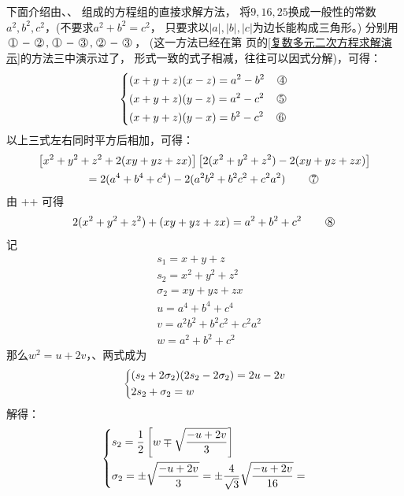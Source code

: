 \begin{enumerate}[label={【\textbf{例\thechapter.\arabic*}】},
 leftmargin=\inteval{\myenumleftmargin}pt,
 itemsep=\inteval{\myenumitempsep}pt,
 itemindent=\inteval{\myenumitemindent}pt]
下面介绍由、、
组成的方程组的直接求解方法，
将$ 9,16,25 $换成一般性的常数$ a^2,b^2,c^2 $，(不要求$ a^2+b^2=c^2 $，
只要求以$ |a|,|b|,|c| $为边长能构成三角形。)
分别用$ \mycircled{1}-\mycircled{2},
\mycircled{1}-\mycircled{3},\mycircled{2}-\mycircled{3} $，
(这一方法已经在第\pageref{复数多元二次方程求解演示} 
页的\ref{复数多元二次方程求解演示}的方法三中演示过了，
形式一致的式子相减，往往可以因式分解)，可得：
\begin{align*}
    \begin{dcases}
        (x+y+z)(x-z)= a^2-b^2 \q \mycircled{4}  \\
        (x+y+z)(y-z)= a^2-c^2 \q \mycircled{5}  \\
        (x+y+z)(y-x)= b^2-c^2 \q \mycircled{6} 
    \end{dcases}
\end{align*}
以上三式左右同时平方后相加，可得：
\begin{gather*}
    \left[ x^2+y^2+z^2+2(xy+yz+zx) \right] \left[ 2(x^2+y^2+z^2)-2(xy+yz+zx) \right] \\
    =2(a^4+b^4+c^4)-2(a^2b^2+b^2c^2+c^2a^2) \tag*{\mycircled{7}}
\end{gather*}
由 ++ 可得
\begin{align*}
    2(x^2+y^2+z^2)+(xy+yz+zx)=a^2+b^2+c^2  \tag*{\mycircled{8}}
\end{align*}
记
\begin{align*}
    & s_1=x+y+z \\
    & s_2=x^2+y^2+z^2 \\
    & \sigma_2=xy+yz+zx  \\
    & u=a^4+b^4+c^4 \\
    & v=a^2b^2+b^2c^2+c^2a^2 \\
    & w=a^2+b^2+c^2
\end{align*}
那么$ w^2=u+2v $，、两式成为
\begin{align*}
    \begin{dcases}
        (s_2+2\sigma_2)(2s_2-2\sigma_2)= 2u-2v \\
        2s_2+\sigma_2 = w
    \end{dcases}
\end{align*}
解得：
\begin{align*}
    \begin{dcases}
        s_2 = \dfrac{1}{2}\left[w \mp \sqrt{\dfrac{-u+2v}{3}}\right] \\
        \sigma_2= \pm \sqrt{\dfrac{-u+2v}{3}}=
        \pm \dfrac{4}{\sqrt{3}}\sqrt{\dfrac{-u+2v}{16}}=

\end{dcases}
\end{align*}
\end{enumerate}

